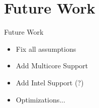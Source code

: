 \documentclass{beamer}
\begin{document}
\section{Future Work}
\begin{frame}{Future Work}
  \begin{itemize}
    \item Fix all assumptions
    \item Add Multicore Support
    \item Add Intel Support (?)
    \pause
    \item Optimizations...
  \end{itemize}
\end{frame}


\end{document}
